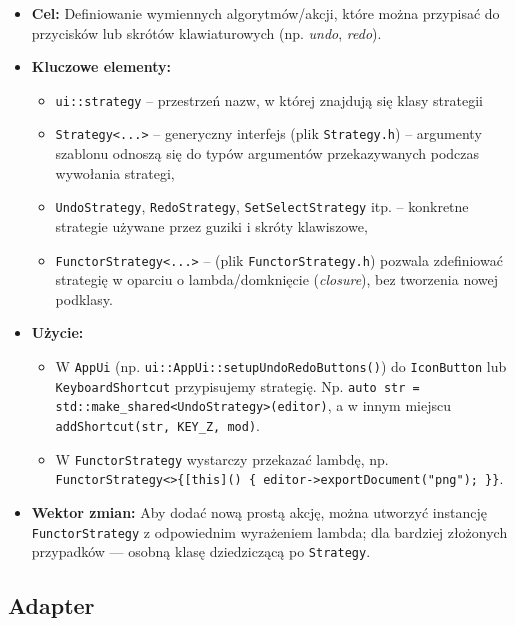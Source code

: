 \documentclass[a4paper,12pt]{article}
\begin{document}
\begin{itemize}
    \item \textbf{Cel:} Definiowanie wymiennych algorytmów/akcji, 
    które można przypisać do przycisków lub skrótów klawiaturowych (np. \emph{undo}, \emph{redo}).
    \item \textbf{Kluczowe elementy:}
    \begin{itemize}
        \item \texttt{ui::strategy} -- przestrzeń nazw, w której znajdują się klasy strategii
        \item \texttt{Strategy<...>} -- generyczny interfejs (plik \texttt{Strategy.h}) 
          -- argumenty szablonu odnoszą się do typów argumentów przekazywanych 
          podczas wywołania strategi, 
        \item \texttt{UndoStrategy}, \texttt{RedoStrategy}, \texttt{SetSelectStrategy} 
        itp. -- konkretne strategie używane przez guziki i skróty klawiszowe,
        \item \texttt{FunctorStrategy<...>} -- (plik \texttt{FunctorStrategy.h}) pozwala zdefiniować strategię
        w oparciu o lambda/domknięcie (\emph{closure}), bez tworzenia nowej podklasy.
    \end{itemize}
    \item \textbf{Użycie:} 
    \begin{itemize}
      \item W \texttt{AppUi} (np. \verb|ui::AppUi::setupUndoRedoButtons()|)
        do \texttt{IconButton} lub \texttt{KeyboardShortcut} przypisujemy 
       strategię. Np. \texttt{auto str = std::make\_shared<UndoStrategy>(editor)},
       a w innym miejscu \texttt{addShortcut(str, KEY\_Z, mod)}.
       \item W \texttt{FunctorStrategy} wystarczy przekazać lambdę, 
       np. \texttt{FunctorStrategy<>\{[this]() \{ editor->exportDocument("png"); \}\}}.
    \end{itemize}
    \item \textbf{Wektor zmian:} Aby dodać nową prostą akcję, można utworzyć
    instancję \texttt{FunctorStrategy} z odpowiednim wyrażeniem lambda; 
    dla bardziej złożonych przypadków — osobną klasę dziedziczącą po \texttt{Strategy}.
\end{itemize}

\subsection{Adapter}
\end{document}
